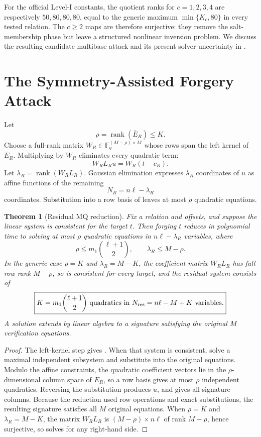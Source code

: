 \documentclass[11pt]{article}
\newtheorem{theorem}{Theorem}
\newcommand{\F}{\mathbb F}
\newcommand{\rank}{\operatorname{rank}}
\begin{document}
For the official Level-I constants, the quotient ranks for $c=1,2,3,4$ are
respectively $50,80,80,80$, equal to the generic maximum
$\min\{K_c,80\}$ in every tested relation.  The $c\ge2$ maps are therefore
surjective: they remove the salt-membership phase but leave a structured
nonlinear inversion problem.  We discuss the resulting candidate multibase
attack and its present solver uncertainty in .

\section{The Symmetry-Assisted Forgery Attack}\label{sec:attack}

Let
\[
 \rho=\rank(\overline E_R)\le K.
\]
Choose a full-rank matrix $W_R\in\F_q^{(M-\rho)\times M}$ whose rows span the left kernel of $\overline E_R$.  Multiplying  by $W_R$ eliminates every quadratic term:
\begin{equation}\label{eq:linear}
 W_RL_Ru=W_R(t-c_R).
\end{equation}
Let $\lambda_R=\rank(W_RL_R)$.  Gaussian elimination expresses $\lambda_R$ coordinates of $u$ as affine functions of the remaining
\[
 N_R=n\ell-\lambda_R
\]
coordinates.  Substitution into a row basis of  leaves at most $\rho$ quadratic equations.

\begin{theorem}[Residual MQ reduction]\label{thm:residual}
Fix a relation and offsets, and suppose the linear system  is consistent for the target $t$.  Then forging $t$ reduces in polynomial time to solving at most $\rho$ quadratic equations in $n\ell-\lambda_R$ variables, where
\[
 \rho\le m_1\binom{\ell+1}{2},
 \qquad
 \lambda_R\le M-\rho.
\]
In the generic case $\rho=K$ and $\lambda_R=M-K$, the coefficient matrix $W_RL_R$ has full row rank $M-\rho$, so  is consistent for \emph{every} target, and the residual system consists of
\begin{equation}\label{eq:resparams}
 \boxed{
 K=m_1\binom{\ell+1}{2}\text{ quadratics in }
 N_{\rm res}=n\ell-M+K\text{ variables}.}
\end{equation}
A solution extends by linear algebra to a signature satisfying the original $M$ verification equations.
\end{theorem}

\begin{proof}
The left-kernel step gives .  When that system is consistent, solve a maximal independent subsystem and substitute into the original equations.  Modulo the affine constraints, the quadratic coefficient vectors lie in the $\rho$-dimensional column space of $\overline E_R$, so a row basis gives at most $\rho$ independent quadratics.  Reversing the substitution produces $u$, and  gives all signature columns.  Because the reduction used row operations and exact substitutions, the resulting signature satisfies all $M$ original equations.  When $\rho=K$ and $\lambda_R=M-K$, the matrix $W_RL_R$ is $(M-\rho)\times n\ell$ of rank $M-\rho$, hence surjective, so  solves for any right-hand side.
\end{proof}
\end{document}
